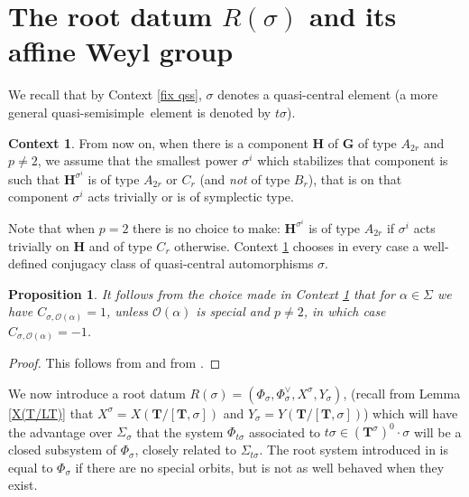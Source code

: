 \documentclass{amsart}
\newtheorem{proposition}[equation]{Proposition}
\numberwithin{equation}{section}
\theoremstyle{definition}
\newtheorem{context}[equation]{Context}
\theoremstyle{remark}
\newcommand\bG{{\mathbf G}}
\newcommand\bH{{\mathbf H}}
\newcommand\bT{{\mathbf T}}
\newcommand\CO{{\mathcal O}}
\newcommand\Tso{{(\bT^\sigma)^0}}
\newcommand\LT{{\bT/[\bT,\sigma]}}
\newcommand\qss{quasi-semisimple}
\begin{document}
\section{The root datum $R(\sigma)$ and its affine Weyl group}
We recall that by Context \ref{fix qss}, $\sigma$ denotes a quasi-central
element (a more general \qss\ element is denoted by $t\sigma$).
\begin{context}\label{sigma symplectic}
From now on, when there is a component $\bH$ of $\bG$ of type $A_{2r}$ and
$p\ne 2$, 
we assume that the smallest power $\sigma^i$ which stabilizes that component
is such that $\bH^{\sigma^i}$ is of type $A_{2r}$ or $C_r$
(and {\em not} of type $B_r$), that is on that component $\sigma^i$ acts
trivially or is of symplectic type. 
\end{context}
Note that when $p=2$ there is no choice to make:
$\bH^{\sigma^i}$ is of type $A_{2r}$ if $\sigma^i$ acts trivially on $\bH$
and of type $C_r$ otherwise.
Context \ref{sigma symplectic}
chooses in every case a well-defined conjugacy class of
quasi-central automorphisms $\sigma$.
\begin{proposition}\label{Csigma,O(alpha)} It follows from the choice
made in Context \ref{sigma symplectic} that for $\alpha\in\Sigma$ we
have $C_{\sigma,\CO(\alpha)}=1$, unless $\CO(\alpha)$ is special and $p\neq 2$,
in which case $C_{\sigma,\CO(\alpha)}=-1$.
\end{proposition}
\begin{proof}
This follows from \cite[1.8(v) and second example page 357]{grnc} and from
\cite[2.5]{qss}.
\end{proof}
We   now  introduce  a  root datum 
$R(\sigma)=(\Phi_\sigma,\Phi_\sigma^\vee, X^\sigma,Y_\sigma)$, 
(recall from Lemma \ref{X(T/LT)} that $X^\sigma=X(\LT)$ and $Y_\sigma=Y(\LT)$) 
which  will have  the advantage over $\Sigma_\sigma$
that the system $\Phi_{t\sigma}$ associated to
$t\sigma\in\Tso\cdot\sigma$ will be a
closed   subsystem  of   $\Phi_\sigma$, closely related to $\Sigma_{t\sigma}$.  The   root  system  introduced  in
\cite[Proposition  2]{Sp} is equal to $\Phi_\sigma$ if there are no special
orbits, but is not as well behaved when they exist.
\end{document}
